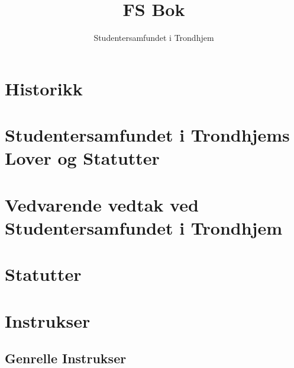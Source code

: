 \documentclass[11pt, a4paper, twosided]{book}
\title{FS Bok}
\author{Studentersamfundet i Trondhjem}
\newcounter{lovkapittel}
\newcounter{lovparagrafcounter}
\begin{document}

\cleardoublepage




\tableofcontents

\part{Historikk}




\part{Studentersamfundet i Trondhjems Lover og Statutter}



\setcounter{lovkapittel}{1}
\setcounter{lovparagrafcounter}{1}


\part{Vedvarende vedtak ved Studentersamfundet i Trondhjem}



\part{Statutter}



\part{Instrukser}

\chapter*{Genrelle Instrukser}











\end{document}
